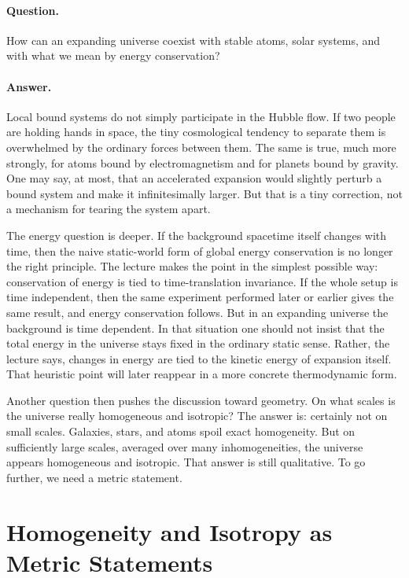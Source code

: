 \paragraph{Question.} How can an expanding universe coexist with stable atoms, solar systems, and with what we mean by energy conservation?

\paragraph{Answer.} Local bound systems do not simply participate in the Hubble flow. If two people are holding hands in space, the tiny cosmological tendency to separate them is overwhelmed by the ordinary forces between them. The same is true, much more strongly, for atoms bound by electromagnetism and for planets bound by gravity. One may say, at most, that an accelerated expansion would slightly perturb a bound system and make it infinitesimally larger. But that is a tiny correction, not a mechanism for tearing the system apart.

The energy question is deeper. If the background spacetime itself changes with time, then the naive static-world form of global energy conservation is no longer the right principle. The lecture makes the point in the simplest possible way: conservation of energy is tied to time-translation invariance. If the whole setup is time independent, then the same experiment performed later or earlier gives the same result, and energy conservation follows. But in an expanding universe the background is time dependent. In that situation one should not insist that the total energy in the universe stays fixed in the ordinary static sense. Rather, the lecture says, changes in energy are tied to the kinetic energy of expansion itself. That heuristic point will later reappear in a more concrete thermodynamic form.

Another question then pushes the discussion toward geometry. On what scales is the universe really homogeneous and isotropic? The answer is: certainly not on small scales. Galaxies, stars, and atoms spoil exact homogeneity. But on sufficiently large scales, averaged over many inhomogeneities, the universe appears homogeneous and isotropic. That answer is still qualitative. To go further, we need a metric statement.

\section{Homogeneity and Isotropy as Metric Statements}

